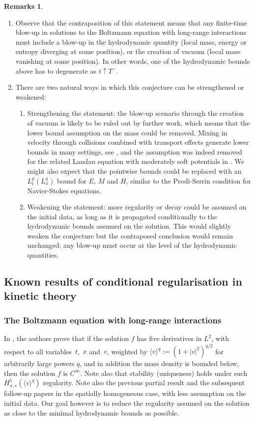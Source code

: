\documentclass[11pt]{article}
\newcommand{\Subsection}{\subsection}
\newcommand{\skpt}{\smallskip}
\theoremstyle{plain}
\theoremstyle{definition}
\newtheorem{remarks}[thm]{Remarks}
\numberwithin{equation}{section}
\begin{document}
\skpt
\begin{remarks}
\begin{enumerate}
\item Observe that the contraposition of this statement means that
any finite-time blow-up in solutions to the Boltzmann equation
with long-range interactions must include a blow-up in the
hydrodynamic quantity (local mass, energy or entropy diverging at
some position), or the creation of vacuum (local mass vanishing at
some position). In other words, one of the hydrodynamic bounds
above has to degenerate as $t \uparrow T^-$.

\item There are two natural ways in which this conjecture can be
strengthened or weakened:
\begin{enumerate}
\item Strengthening the statement: the blow-up scenario through
the creation of vacuum is likely to be ruled out by further
work, which means that the lower bound assumption on the mass
could be removed. Mixing in velocity through collisions combined
with transport effects generate lower bounds in many settings,
see \cite{MR2153518,MR2746671,MR3375544,MR3356579}, and the
assumption was indeed removed for the related Landau equation
with moderately soft potentials in \cite{henderson2017local}.
We might also expect that the pointwise bounds could be replaced
with an $L_t^p(L_x^q)$ bound for $E$, $M$ and $H$, similar to
the Prodi-Serrin condition for Navier-Stokes equations.
\item Weakening the statement: more regularity or decay could be
assumed on the initial data, as long as it is propagated
conditionally to the hydrodynamic bounds assumed on the
solution. This would slightly weaken the conjecture but the
contraposed conclusion would remain unchanged: any blow-up must
occur at the level of the hydrodynamic quantities.
\end{enumerate}
\end{enumerate}
\end{remarks}

\Subsection{Known results of conditional regularisation in kinetic
theory}

\subsubsection{The Boltzmann equation with long-range interactions}
In \cite{amuxy-arma2010}, the authors prove that if the solution $f$ has
five derivatives in $L^2$, with respect to all variables~$t$,~$x$ and~$v$, weighted by $\langle v \rangle^q := (1+|v|^2)^{q/2}$ for
arbitrarily large powers $q$, and in addition the mass density is
bounded below, then the solution $f$ is $C^\infty$. Note also that
stability (uniqueness) holds under such
$H^5_{x,v}(\langle v \rangle^q)$ regularity. Note also the previous
partial result \cite{MR2038147} and the subsequent follow-up papers
\cite{MR2149928,MR2425608,MR2462585,MR2476677,MR2476686} in the
spatially homogeneous case, with less assumption on the initial
data. Our goal however is to reduce the regularity assumed on the
solution as close to the minimal hydrodynamic bounds as possible.
\end{document}
